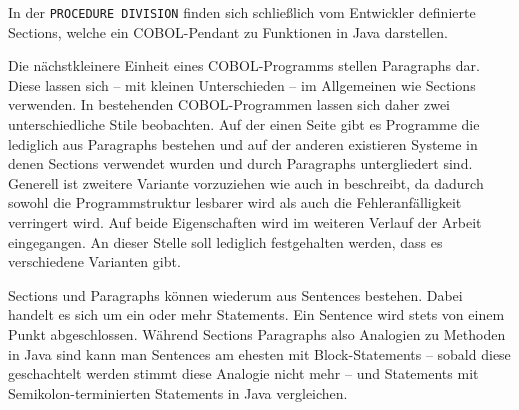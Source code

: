 In der \texttt{PROCEDURE DIVISION} finden sich schließlich vom Entwickler definierte Sections, welche ein COBOL-Pendant zu Funktionen in Java darstellen.

Die nächstkleinere Einheit eines COBOL-Programms stellen Paragraphs dar. Diese lassen sich -- mit kleinen Unterschieden -- im Allgemeinen wie Sections verwenden. In bestehenden COBOL-Programmen lassen sich daher zwei unterschiedliche Stile beobachten. Auf der einen Seite gibt es Programme die lediglich aus Paragraphs bestehen und auf der anderen existieren Systeme in denen Sections verwendet wurden und durch Paragraphs untergliedert sind. Generell ist zweitere Variante vorzuziehen wie auch \citeauthor{richards_enhancing_1984} in  beschreibt, da dadurch sowohl die Programmstruktur lesbarer wird als auch die Fehleranfälligkeit verringert wird. Auf beide Eigenschaften wird im weiteren Verlauf der Arbeit eingegangen. An dieser Stelle soll lediglich festgehalten werden, dass es verschiedene Varianten gibt.

Sections und Paragraphs können wiederum aus Sentences bestehen. Dabei handelt es sich um ein oder mehr Statements. Ein Sentence wird stets von einem Punkt abgeschlossen. Während Sections Paragraphs also Analogien zu Methoden in Java sind kann man Sentences am ehesten mit Block-Statements -- sobald diese geschachtelt werden stimmt diese Analogie nicht mehr -- und Statements mit Semikolon-terminierten Statements in Java vergleichen.


